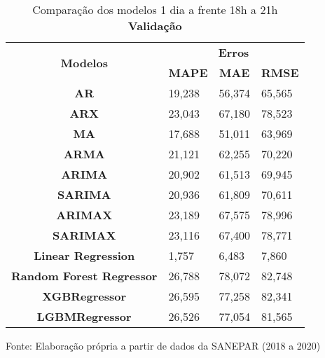 \begin{table}[H]
	\centering
	\caption{Comparação dos modelos 1 dia a frente 18h a 21h \textbf{Validação} }\label{tb:1-18vld}
	\begin{tabular}{@{}clll@{}}
		\toprule
		\multirow{2}{*}{\textbf{Modelos}} & \multicolumn{3}{c}{\textbf{Erros}}                                                                       \\ \cmidrule(l){2-4} 
		& \multicolumn{1}{c}{\textbf{MAPE}} & \multicolumn{1}{c}{\textbf{MAE}} & \multicolumn{1}{c}{\textbf{RMSE}} \\ \hline
		\textbf{AR}                       & 19,238                            & 56,374                           & 65,565                            \\
		\textbf{ARX}                      & 23,043                            & 67,180                           & 78,523                            \\
		\textbf{MA}                       & 17,688                            & 51,011                           & 63,969                            \\
		\textbf{ARMA}                     & 21,121                            & 62,255                           & 70,220                            \\
		\textbf{ARIMA}                    & 20,902                            & 61,513                           & 69,945                            \\
		\textbf{SARIMA}                   & 20,936                            & 61,809                           & 70,611                            \\
		\textbf{ARIMAX}                   & 23,189                            & 67,575                           & 78,996                            \\
		\textbf{SARIMAX}                  & 23,116                            & 67,400                           & 78,771                            \\
		\textbf{Linear Regression}        & 1,757                             & 6,483                            & 7,860                             \\
		\textbf{Random Forest Regressor}  & 26,788                            & 78,072                           & 82,748                            \\
		\textbf{XGBRegressor}             & 26,595                            & 77,258                           & 82,341                            \\
		\textbf{LGBMRegressor}            & 26,526                            & 77,054                           & 81,565                            \\ \hline
	\end{tabular}

Fonte: Elaboração própria a partir de dados da SANEPAR (2018 a 2020)
\end{table}

